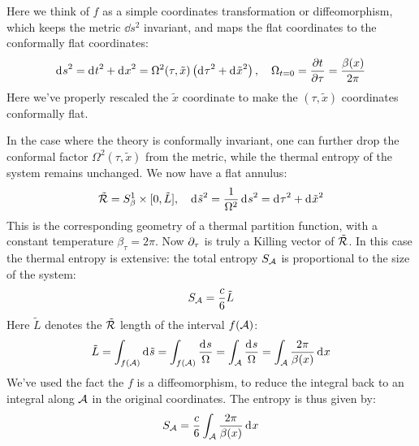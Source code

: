 \documentclass[11pt,a4paper,utf8]{article}
\begin{document}
	Here we think of $f$ as a simple coordinates transformation or diffeomorphism, which keeps the metric $\dd{s}^2$ invariant, and maps the flat coordinates to the conformally flat coordinates:
	\begin{equation}
		\mathinner{\mathrm{d}^{}s}^2
		= \mathinner{\mathrm{d}^{}t}^2 + \mathinner{\mathrm{d}^{}x}^2
		= \Omega^2(\tau,\tilde{x}) \left(
				\mathinner{\mathrm{d}^{}\tau}^2 + \mathinner{\mathrm{d}^{}\tilde{x}}^2
			\right),
	\quad
		\Omega_{t = 0} = \frac{\partial{t}}{\partial{\tau}}
		= \frac{\beta(x)}{2\pi}
	\end{equation}
	Here we've properly rescaled the $\tilde{x}$ coordinate to make the $(\tau,\tilde{x})$ coordinates conformally flat. 
	
	In the case where the theory is conformally invariant, one can further drop the conformal factor $\Omega^2(\tau,\tilde{x})$ from the metric, while the thermal entropy of the system remains unchanged. We now have a flat annulus:
	\begin{equation}
		\tilde{\mathcal{R}}
		= S^1_\beta \times [0,\tilde{L}],
	\quad
		\mathinner{\mathrm{d}^{}\tilde{s}}^2
		= \frac{1}{\Omega^2} \mathinner{\mathrm{d}^{}s}^2
		= \mathinner{\mathrm{d}^{}\tau}^2 + \mathinner{\mathrm{d}^{}\tilde{x}}^2
	\end{equation}
	This is the corresponding geometry of a thermal partition function, with a constant temperature $\beta_\tau = 2\pi$. 
	Now $\partial_{\tau}$ is truly a Killing vector of $\tilde{\mathcal{R}}$. 
	In this case the thermal entropy is extensive: the total entropy $S_{\mathcal{A}}$ is proportional to the size of the system:
	\begin{equation}
		S_{\mathcal{A}}
		= \frac{c}{6} \tilde{L}
	\end{equation}
	Here $\tilde{L}$ denotes the $\tilde{\mathcal{R}}$ length of the interval $f(\mathcal{A})$:
	\begin{equation}
		\tilde{L}
		= \int_{f(\mathcal{A})} \mathinner{\mathrm{d}^{}\tilde{s}}
		= \int_{f(\mathcal{A})} \frac{\mathinner{\mathrm{d}^{}s}}{\Omega}
		= \int_{\mathcal{A}} \frac{\mathinner{\mathrm{d}^{}s}}{\Omega}
		= \int_{\mathcal{A}} \frac{2\pi}{\beta(x)} \mathinner{\mathrm{d}^{}x}
	\end{equation}
	We've used the fact the $f$ is a diffeomorphism, to reduce the integral back to an integral along $\mathcal{A}$ in the original coordinates. 
	The entropy is thus given by:
	\begin{equation}
		S_{\mathcal{A}}
		= \frac{c}{6}
			\int_{\mathcal{A}} \frac{2\pi}{\beta(x)} \mathinner{\mathrm{d}^{}x}
	\end{equation}
	
\end{document}
